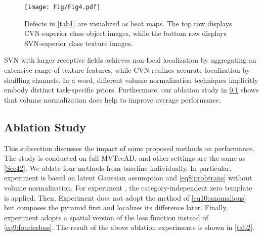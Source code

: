 \begin{figure}
    \centering
    \setlength{\abovecaptionskip}{0.cm} \setlength{\belowcaptionskip}{-0.6cm} 

    \texttt{[image: Fig/Fig4.pdf]}
    
    \caption{
        Defects in \cref{tab1} are visualized as heat maps. The top row displays CVN-superior class object images, while the bottom row displays SVN-superior class texture images.
    }
    \label{fig4}
\end{figure}

SVN with larger receptive fields achieves non-local localization by aggregating an extensive range of texture features, while CVN realizes accurate localization by shuffling channels. In a word, different volume normalization techniques implicitly embody distinct task-specific priors.
Furthermore, our ablation study in \cref{Sec43} shows that volume normalization does help to improve average performance.


\subsection{Ablation Study}\label{Sec43}
This subsection discusses the impact of some proposed methods on performance. The study is conducted on full MVTecAD, and other settings are the same as \cref{Sec42}. We ablate four methods from baseline individually. 
In particular, experiment  is based on latent Gaussian assumption and \cref{eq8:probtrans} without volume normalization. For experiment , the category-independent zero template  is applied.
Then, Experiment  does not adopt the method of \cref{eq10:anomalious} but composes the pyramid first and localizes its difference later. Finally, experiment  adopts a spatial version of the loss function instead of \cref{eq9:fourierloss}.
The result of the above ablation experiments is shown in \cref{tab2}.



